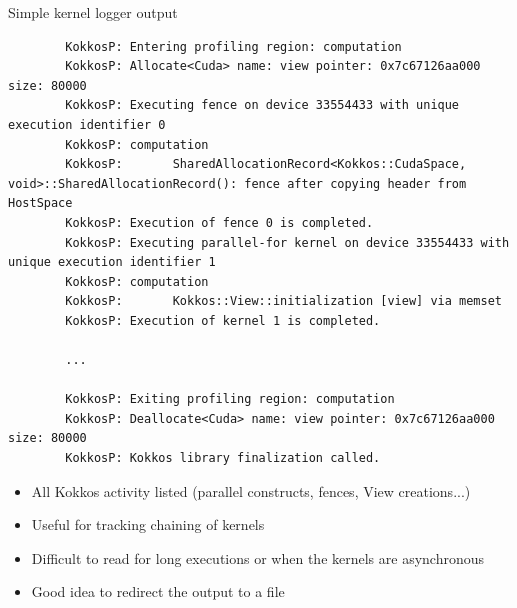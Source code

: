 \documentclass[
    aspectratio=169,
    \createHandout
]{beamer}
\begin{document}
\begin{frame}[fragile]{Simple kernel logger output}
    \begin{verbatim}
        KokkosP: Entering profiling region: computation
        KokkosP: Allocate<Cuda> name: view pointer: 0x7c67126aa000 size: 80000
        KokkosP: Executing fence on device 33554433 with unique execution identifier 0
        KokkosP: computation
        KokkosP:       SharedAllocationRecord<Kokkos::CudaSpace, void>::SharedAllocationRecord(): fence after copying header from HostSpace
        KokkosP: Execution of fence 0 is completed.
        KokkosP: Executing parallel-for kernel on device 33554433 with unique execution identifier 1
        KokkosP: computation
        KokkosP:       Kokkos::View::initialization [view] via memset
        KokkosP: Execution of kernel 1 is completed.

        ...

        KokkosP: Exiting profiling region: computation
        KokkosP: Deallocate<Cuda> name: view pointer: 0x7c67126aa000 size: 80000
        KokkosP: Kokkos library finalization called.
    \end{verbatim}

    \begin{itemize}
        \item All Kokkos activity listed (parallel constructs, fences, View creations...)
        \item Useful for tracking chaining of kernels
        \item Difficult to read for long executions or when the kernels are asynchronous
        \item Good idea to redirect the output to a file
    \end{itemize}
\end{frame}
\end{document}
